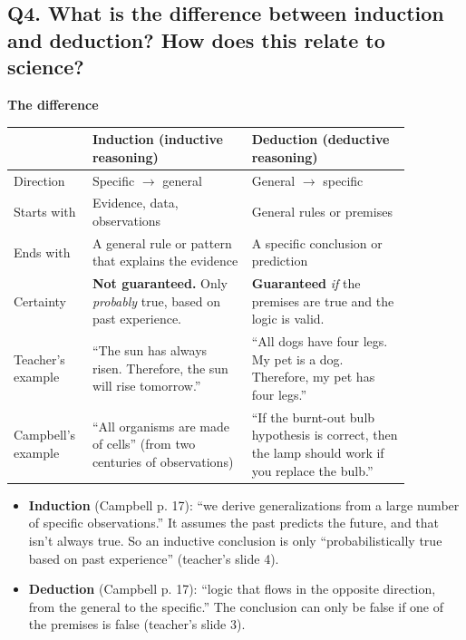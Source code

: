 \documentclass[11pt,letterpaper]{article}
\begin{document}
\subsection{Q4. What is the difference between induction and deduction? How does this relate to science?}

\textbf{The difference}

\begin{longtable}{@{}>{\raggedright\arraybackslash}p{0.13\linewidth}>{\raggedright\arraybackslash}p{0.37\linewidth}>{\raggedright\arraybackslash}p{0.37\linewidth}@{}}
\toprule
 & Induction (inductive reasoning) & Deduction (deductive reasoning) \\
\midrule
\endhead
Direction & Specific $\rightarrow$ general & General $\rightarrow$ specific \\
Starts with & Evidence, data, observations & General rules or premises \\
Ends with & A general rule or pattern that explains the evidence & A specific conclusion or prediction \\
Certainty & \textbf{Not guaranteed.} Only \emph{probably} true, based on past experience. & \textbf{Guaranteed} \emph{if} the premises are true and the logic is valid. \\
Teacher's example & ``The sun has always risen. Therefore, the sun will rise tomorrow.'' & ``All dogs have four legs. My pet is a dog. Therefore, my pet has four legs.'' \\
Campbell's example & ``All organisms are made of cells'' (from two centuries of observations) & ``If the burnt-out bulb hypothesis is correct, then the lamp should work if you replace the bulb.'' \\
\bottomrule
\end{longtable}

\begin{itemize}
  \item \textbf{Induction} (Campbell p. 17): ``we derive generalizations from a large number of specific observations.'' It assumes the past predicts the future, and that isn't always true. So an inductive conclusion is only ``probabilistically true based on past experience'' (teacher's slide 4).
  \item \textbf{Deduction} (Campbell p. 17): ``logic that flows in the opposite direction, from the general to the specific.'' The conclusion can only be false if one of the premises is false (teacher's slide 3).
\end{itemize}
\end{document}
